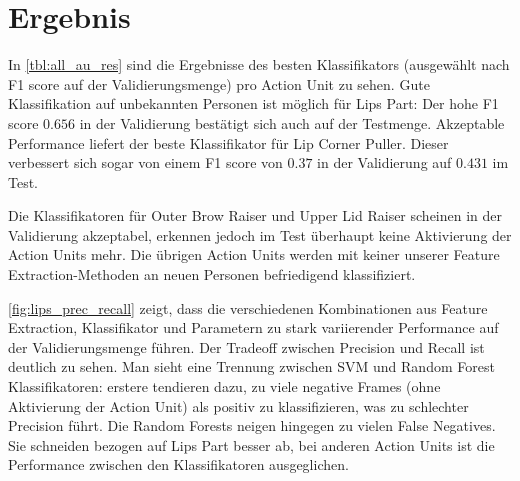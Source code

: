 \chapter{Ergebnis}



In \cref{tbl:all_au_res} sind die Ergebnisse des besten Klassifikators
(ausgewählt nach F1 score auf der Validierungsmenge) pro Action Unit zu sehen.
Gute Klassifikation auf unbekannten Personen ist möglich für Lips Part: Der hohe
F1 score $0.656$ in der Validierung bestätigt sich auch auf der Testmenge. Akzeptable
Performance liefert der beste Klassifikator für Lip Corner Puller. Dieser
verbessert sich sogar von einem F1 score von $0.37$ in der Validierung auf
$0.431$ im Test.

Die Klassifikatoren für Outer Brow Raiser und Upper Lid Raiser scheinen in der
Validierung akzeptabel, erkennen jedoch im Test überhaupt keine Aktivierung der
Action Units mehr. Die übrigen Action Units werden mit keiner unserer Feature
Extraction-Methoden an neuen Personen befriedigend klassifiziert.

\cref{fig:lips_prec_recall} zeigt, dass die verschiedenen Kombinationen aus
Feature Extraction, Klassifikator und Parametern zu stark variierender
Performance auf der Validierungsmenge führen. Der Tradeoff zwischen Precision
und Recall ist deutlich zu sehen. Man sieht eine Trennung zwischen SVM und
Random Forest Klassifikatoren: erstere tendieren dazu, zu viele negative Frames
(ohne Aktivierung der Action Unit) als positiv zu klassifizieren, was zu
schlechter Precision führt. Die Random Forests neigen hingegen zu vielen False
Negatives. Sie schneiden bezogen auf Lips Part besser ab, bei anderen Action
Units ist die Performance zwischen den Klassifikatoren ausgeglichen.

